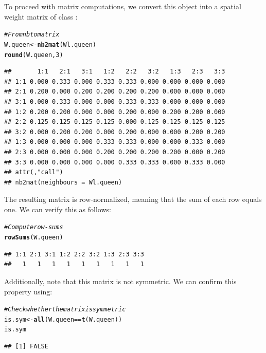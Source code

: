 \documentclass[english,12pt]{book}\usepackage[]{graphicx}\usepackage[]{xcolor}
\makeatletter
\newcommand{\hlnum}[1]{\textcolor[rgb]{0.686,0.059,0.569}{#1}}%
\newcommand{\hlcom}[1]{\textcolor[rgb]{0.678,0.584,0.686}{\textit{#1}}}%
\newcommand{\hlopt}[1]{\textcolor[rgb]{0,0,0}{#1}}%
\newcommand{\hldef}[1]{\textcolor[rgb]{0.345,0.345,0.345}{#1}}%
\newcommand{\hlkwb}[1]{\textcolor[rgb]{0.69,0.353,0.396}{#1}}%
\newcommand{\hlkwd}[1]{\textcolor[rgb]{0.737,0.353,0.396}{\textbf{#1}}}%
\newenvironment{kframe}{%
 \def\at@end@of@kframe{}%
 \ifinner\ifhmode%
  \def\at@end@of@kframe{\end{minipage}}%
  \begin{minipage}{\columnwidth}%
 \fi\fi%
 \def\FrameCommand##1{\hskip\@totalleftmargin \hskip-\fboxsep
 \colorbox{shadecolor}{##1}\hskip-\fboxsep
     \hskip-\linewidth \hskip-\@totalleftmargin \hskip\columnwidth}%
 \MakeFramed {\advance\hsize-\width
   \@totalleftmargin\z@ \linewidth\hsize
   \@setminipage}}%
 {\par\unskip\endMakeFramed%
 \at@end@of@kframe}
\newenvironment{knitrout}{}{} %
\makeatother
\begin{document}
To proceed with matrix computations, we convert this  object into a spatial weight matrix of class :
\begin{knitrout}
\color{fgcolor}\begin{kframe}
\begin{alltt}
\hlcom{# From nb to matrix}
\hldef{W.queen} \hlkwb{<-} \hlkwd{nb2mat}\hldef{(Wl.queen)}
\hlkwd{round}\hldef{(W.queen,} \hlnum{3}\hldef{)}
\end{alltt}
\begin{verbatim}
##       1:1   2:1   3:1   1:2   2:2   3:2   1:3   2:3   3:3
## 1:1 0.000 0.333 0.000 0.333 0.333 0.000 0.000 0.000 0.000
## 2:1 0.200 0.000 0.200 0.200 0.200 0.200 0.000 0.000 0.000
## 3:1 0.000 0.333 0.000 0.000 0.333 0.333 0.000 0.000 0.000
## 1:2 0.200 0.200 0.000 0.000 0.200 0.000 0.200 0.200 0.000
## 2:2 0.125 0.125 0.125 0.125 0.000 0.125 0.125 0.125 0.125
## 3:2 0.000 0.200 0.200 0.000 0.200 0.000 0.000 0.200 0.200
## 1:3 0.000 0.000 0.000 0.333 0.333 0.000 0.000 0.333 0.000
## 2:3 0.000 0.000 0.000 0.200 0.200 0.200 0.200 0.000 0.200
## 3:3 0.000 0.000 0.000 0.000 0.333 0.333 0.000 0.333 0.000
## attr(,"call")
## nb2mat(neighbours = Wl.queen)
\end{verbatim}
\end{kframe}
\end{knitrout}

The resulting matrix is row-normalized, meaning that the sum of each row equals one. We can verify this as follows:
\begin{knitrout}
\color{fgcolor}\begin{kframe}
\begin{alltt}
\hlcom{# Compute row-sums}
\hlkwd{rowSums}\hldef{(W.queen)}
\end{alltt}
\begin{verbatim}
## 1:1 2:1 3:1 1:2 2:2 3:2 1:3 2:3 3:3 
##   1   1   1   1   1   1   1   1   1
\end{verbatim}
\end{kframe}
\end{knitrout}

Additionally, note that this matrix is not symmetric. We can confirm this property using:
\begin{knitrout}
\color{fgcolor}\begin{kframe}
\begin{alltt}
\hlcom{# Check whether the matrix is symmetric}
\hldef{is.sym} \hlkwb{<-} \hlkwd{all}\hldef{(W.queen} \hlopt{==} \hlkwd{t}\hldef{(W.queen))}
\hldef{is.sym}
\end{alltt}
\begin{verbatim}
## [1] FALSE
\end{verbatim}
\end{kframe}
\end{knitrout}
\end{document}
